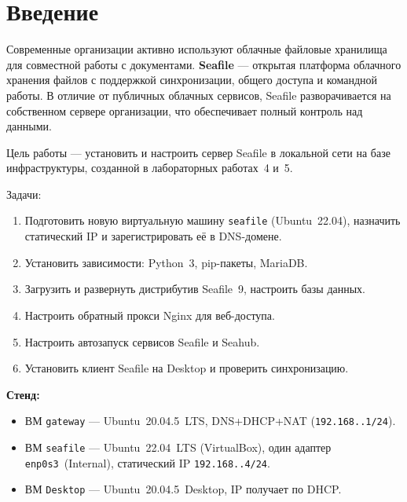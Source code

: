 \chapter*{Введение}
\label{ch:intro}

Современные организации активно используют облачные файловые хранилища для совместной
работы с документами. \textbf{Seafile} — открытая платформа облачного хранения файлов с поддержкой
синхронизации, общего доступа и командной работы. В отличие от публичных облачных
сервисов, Seafile разворачивается на собственном сервере организации, что обеспечивает
полный контроль над данными.

Цель работы — установить и настроить сервер Seafile в локальной сети
на базе инфраструктуры, созданной в лабораторных работах~4 и~5.

Задачи:
\begin{enumerate}
  \item Подготовить новую виртуальную машину \texttt{seafile} (Ubuntu~22.04),
        назначить статический IP и зарегистрировать её в DNS-домене.
  \item Установить зависимости: Python~3, pip-пакеты, MariaDB.
  \item Загрузить и развернуть дистрибутив Seafile~9, настроить базы данных.
  \item Настроить обратный прокси Nginx для веб-доступа.
  \item Настроить автозапуск сервисов Seafile и Seahub.
  \item Установить клиент Seafile на Desktop и проверить синхронизацию.
\end{enumerate}

\textbf{Стенд:}
\begin{itemize}
  \item ВМ \texttt{gateway} — Ubuntu~20.04.5~LTS, DNS+DHCP+NAT
        (\texttt{192.168.\cfgLabStudentN.1/24}).
  \item ВМ \texttt{seafile} — Ubuntu~22.04~LTS (VirtualBox),
        один адаптер \texttt{enp0s3}~(Internal),
        статический IP \texttt{192.168.\cfgLabStudentN.4/24}.
  \item ВМ \texttt{Desktop} — Ubuntu~20.04.5~Desktop,
        IP получает по DHCP.
\end{itemize}

\endinput
